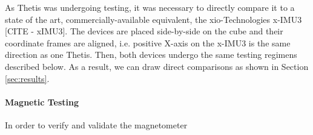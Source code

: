 As Thetis was undergoing testing, it was necessary to directly compare it to a state of the art, commercially-available equivalent, the xio-Technologies x-IMU3 [CITE - xIMU3].
The devices are placed side-by-side on the cube and their coordinate frames are aligned, i.e. positive X-axis on the x-IMU3 is the same direction as one Thetis.
Then, both devices undergo the same testing regimens described below.
As a result, we can draw direct comparisons as shown in Section \ref{sec:results}.

\paragraph*{Magnetic Testing} In order to verify and validate the magnetometer